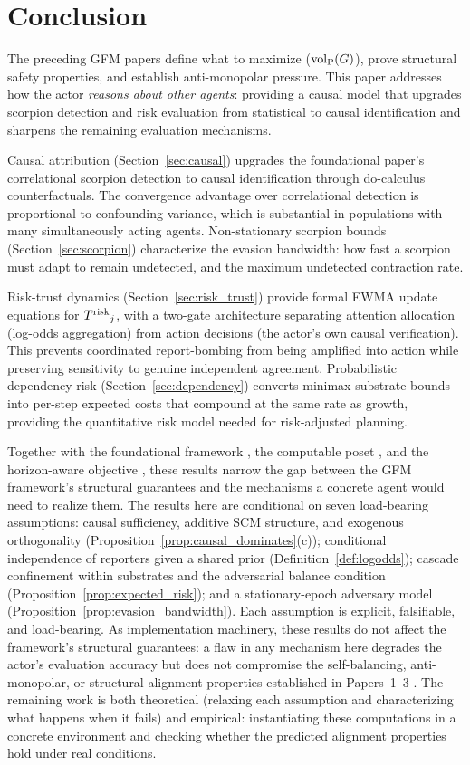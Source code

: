 \section{Conclusion}
\label{sec:conclusion}

The preceding GFM papers define what to maximize (${\operatorname{vol}_{\mathrm{P}}}(G)$), prove
structural safety properties, and establish anti-monopolar pressure. This
paper addresses how the actor \emph{reasons about other agents}: providing
a causal model that upgrades scorpion detection and risk evaluation from
statistical to causal identification and sharpens the remaining
evaluation mechanisms.

Causal attribution (Section~\ref{sec:causal}) upgrades the foundational
paper's correlational scorpion detection to causal identification through
do-calculus counterfactuals. The convergence advantage over correlational
detection is proportional to confounding variance, which is substantial in
populations with many simultaneously acting agents. Non-stationary scorpion
bounds (Section~\ref{sec:scorpion}) characterize the evasion bandwidth: how
fast a scorpion must adapt to remain undetected, and the maximum undetected
contraction rate.

Risk-trust dynamics (Section~\ref{sec:risk_trust}) provide formal EWMA
update equations for ${T^{\mathrm{risk}}}_j$, with a two-gate architecture separating
attention allocation (log-odds aggregation) from action decisions (the
actor's own causal verification). This prevents coordinated report-bombing from being amplified into
action while preserving sensitivity to genuine independent agreement. Probabilistic
dependency risk (Section~\ref{sec:dependency}) converts minimax substrate
bounds into per-step expected costs that compound at the same rate as
growth, providing the quantitative risk model needed for risk-adjusted
planning.

Together with the foundational framework \citep{lasser2026gfm}, the
computable poset \citep{lasser2026poset}, and the horizon-aware objective
\citep{lasser2026horizon}, these results narrow the gap between the GFM
framework's structural guarantees and the mechanisms a concrete agent
would need to realize them. The results here are conditional on seven load-bearing assumptions:
causal sufficiency, additive SCM structure, and exogenous
orthogonality (Proposition~\ref{prop:causal_dominates}(c));
conditional independence of reporters given a shared prior
(Definition~\ref{def:logodds});
cascade confinement within substrates and the adversarial balance
condition (Proposition~\ref{prop:expected_risk}); and a
stationary-epoch adversary model
(Proposition~\ref{prop:evasion_bandwidth}). Each
assumption is explicit, falsifiable, and load-bearing.
As implementation machinery, these results do not affect the
framework's structural guarantees: a flaw in any mechanism here
degrades the actor's evaluation accuracy but does not compromise
the self-balancing, anti-monopolar, or structural alignment
properties established in Papers~1--3
\citep{lasser2026gfm, lasser2026poset, lasser2026horizon}.
The remaining
work is both theoretical (relaxing each assumption and characterizing
what happens when it fails) and empirical: instantiating these
computations in a concrete environment and checking whether the
predicted alignment properties hold under real conditions.
